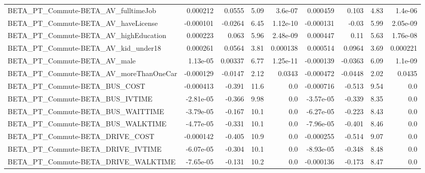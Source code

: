 \begin{tabular}{lrrrrrrrr}
BETA\_PT\_Commute-BETA\_AV\_fulltimeJob                &    0.000212 &       0.0555 &     5.09 &  3.6e-07 &   0.000459 &       0.103 &         4.83 &       1.4e-06 \\
BETA\_PT\_Commute-BETA\_AV\_haveLicense                &   -0.000101 &      -0.0264 &     6.45 & 1.12e-10 &  -0.000131 &       -0.03 &         5.99 &      2.05e-09 \\
BETA\_PT\_Commute-BETA\_AV\_highEducation              &    0.000223 &        0.063 &     5.96 & 2.48e-09 &   0.000447 &        0.11 &         5.63 &      1.76e-08 \\
BETA\_PT\_Commute-BETA\_AV\_kid\_under18                &    0.000261 &       0.0564 &     3.81 & 0.000138 &   0.000514 &      0.0964 &         3.69 &      0.000221 \\
BETA\_PT\_Commute-BETA\_AV\_male                       &    1.13e-05 &      0.00337 &     6.77 & 1.25e-11 &  -0.000139 &     -0.0363 &         6.09 &       1.1e-09 \\
BETA\_PT\_Commute-BETA\_AV\_moreThanOneCar             &   -0.000129 &      -0.0147 &     2.12 &   0.0343 &  -0.000472 &     -0.0448 &         2.02 &        0.0435 \\
BETA\_PT\_Commute-BETA\_BUS\_COST                      &   -0.000413 &       -0.391 &     11.6 &      0.0 &  -0.000716 &      -0.513 &         9.54 &           0.0 \\
BETA\_PT\_Commute-BETA\_BUS\_IVTIME                    &   -2.81e-05 &       -0.366 &     9.98 &      0.0 &  -3.57e-05 &      -0.339 &         8.35 &           0.0 \\
BETA\_PT\_Commute-BETA\_BUS\_WAITTIME                  &   -3.79e-05 &       -0.167 &     10.1 &      0.0 &  -6.27e-05 &      -0.223 &         8.43 &           0.0 \\
BETA\_PT\_Commute-BETA\_BUS\_WALKTIME                  &   -4.77e-05 &       -0.331 &     10.1 &      0.0 &  -7.96e-05 &      -0.401 &         8.46 &           0.0 \\
BETA\_PT\_Commute-BETA\_DRIVE\_COST                    &   -0.000142 &       -0.405 &     10.9 &      0.0 &  -0.000255 &      -0.514 &         9.07 &           0.0 \\
BETA\_PT\_Commute-BETA\_DRIVE\_IVTIME                  &   -6.07e-05 &       -0.304 &     10.1 &      0.0 &  -8.93e-05 &      -0.348 &         8.48 &           0.0 \\
BETA\_PT\_Commute-BETA\_DRIVE\_WALKTIME                &   -7.65e-05 &       -0.131 &     10.2 &      0.0 &  -0.000136 &      -0.173 &         8.47 &           0.0 \\

\end{tabular}
